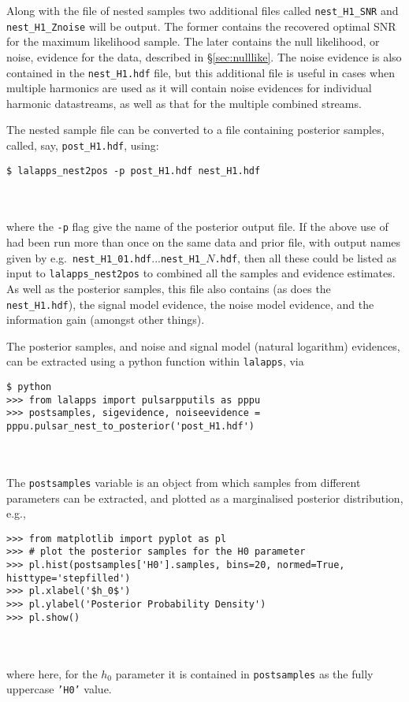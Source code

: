 Along with the file of nested samples two additional files called {\tt nest\_H1\_SNR} and {\tt nest\_H1\_Znoise} will be output. The former contains the
recovered optimal SNR for the maximum likelihood sample. The later contains the null likelihood, or noise, evidence for the data, described in
\S\ref{sec:nulllike}. The noise evidence is also contained in the {\tt nest\_H1.hdf} file, but this additional file is useful in cases when multiple
harmonics are used as it will contain noise evidences for individual harmonic datastreams, as well as that for the multiple combined streams.

The nested sample file can be converted to a file containing posterior samples, called, say, {\tt post\_H1.hdf}, using:
\begin{lrbox}{\Lst}
\begin{lstlisting}
$ lalapps_nest2pos -p post_H1.hdf nest_H1.hdf
\end{lstlisting}
\end{lrbox}
\\[5pt] \indent \fbox{\usebox{\Lst}} \\[5pt]
where the {\tt -p} flag give the name of the posterior output file. If the above use of \lppen had been run more than once on the same data and prior file,
with output names given by e.g.\ {\tt nest\_H1\_01.hdf}...{\tt nest\_H1\_$N$.hdf}, then all these could be listed as input to {\tt lalapps\_nest2pos} to
combined all the samples and evidence estimates. As well as the posterior samples, this file also contains (as does the {\tt nest\_H1.hdf}),
the signal model evidence, the noise model evidence, and the information gain (amongst other things).

The posterior samples, and noise and signal model (natural logarithm) evidences, can be extracted using a python function within {\tt lalapps}, via
\begin{lrbox}{\Lst}
\begin{lstlisting}
$ python
>>> from lalapps import pulsarpputils as pppu
>>> postsamples, sigevidence, noiseevidence = pppu.pulsar_nest_to_posterior('post_H1.hdf')
\end{lstlisting}
\end{lrbox}
\\[5pt] \indent \fbox{\usebox{\Lst}} \\[5pt]
The {\tt postsamples} variable is an object from which samples from different parameters can be extracted, and plotted as a marginalised posterior
distribution, e.g.,
\begin{lrbox}{\Lst}
\begin{lstlisting}
>>> from matplotlib import pyplot as pl
>>> # plot the posterior samples for the H0 parameter
>>> pl.hist(postsamples['H0'].samples, bins=20, normed=True, histtype='stepfilled')
>>> pl.xlabel('$h_0$')
>>> pl.ylabel('Posterior Probability Density')
>>> pl.show()
\end{lstlisting}
\end{lrbox}
\\[5pt] \indent \fbox{\usebox{\Lst}} \\[5pt]
where here, for the $h_0$ parameter it is contained in {\tt postsamples} as the fully uppercase {\tt 'H0'} value. 


